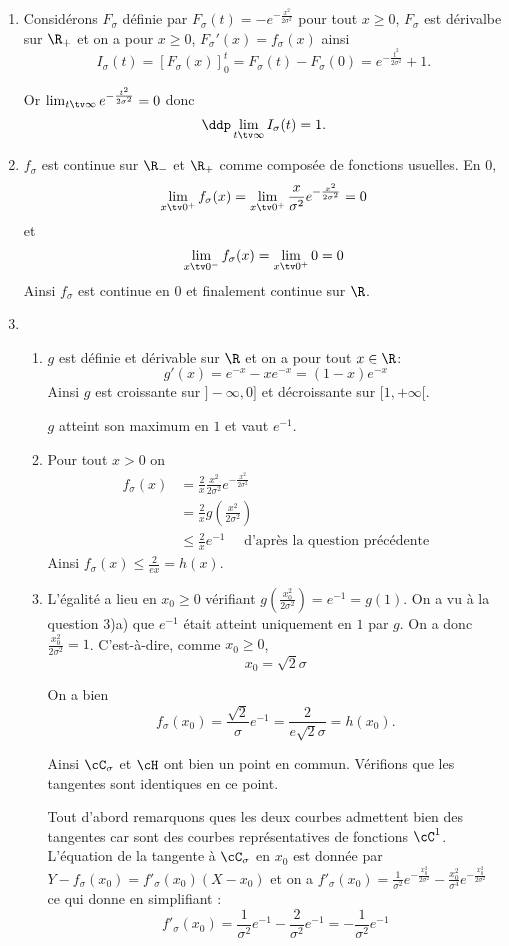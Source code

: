 \begin{correction}
\begin{enumerate}
\item Considérons $F_\sigma$ définie par $F_\sigma(t) =-e^{-\frac{x^2}{2\sigma^2}}$ pour tout $x\geq 0$, $F_\sigma$ est dérivalbe sur $\R_+$ et on a pour $x\geq 0$, $F_\sigma'(x) = f_\sigma(x)$ ainsi
$$I_\sigma( t) =\left[ F_\sigma(x) \right]_0^t = F_\sigma(t) -F_\sigma(0)= e^{-\frac{t^2}{2\sigma^2}}+1.$$

Or $\lim_{t\tv \infty} e^{-\frac{t^2}{2\sigma^2}}=0$ donc 
$$\ddp \lim_{t\tv \infty} I_\sigma(t) =1.$$
\item $f_\sigma $ est continue sur $\R_- $ et $\R_+$ comme composée de fonctions usuelles. En $0$, 
$$\lim_{x\tv 0^+} f_\sigma(x)  = \lim_{x\tv 0^+} \frac{x}{\sigma^2}e^{-\frac{x^2}{2\sigma^2}}  =0$$ 
et 
$$\lim_{x\tv 0^-} f_\sigma(x)  = \lim_{x\tv 0^+} 0 =0$$ 
Ainsi $f_\sigma $ est continue en $0$ et finalement continue sur $\R$. 
\item 
\begin{enumerate}
\item $g$ est définie et dérivable sur $\R$ et on a pour tout $x\in \R$: 
$$g'(x) = e^{-x} -xe^{-x} = (1-x) e^{-x}$$
Ainsi $g$ est croissante sur $]-\infty, 0] $ et décroissante sur $[1,+\infty[$. 

$g$ atteint son maximum en $1$ et vaut $e^{-1}$. 
\item Pour tout $x> 0$ on   
\begin{align*}
f_\sigma(x)& = \frac{2}{x}  \frac{x^2}{2\sigma^2}e^{-\frac{x^2}{2\sigma^2}} \\
				&= \frac{2}{x}   g(\frac{x^2}{2\sigma^2})\\
				&\leq \frac{2}{x}   e^{-1} \quad \text{ d'après la question précédente} 
\end{align*}
 Ainsi $f_\sigma(x) \leq \frac{2}{ex} =h(x)$.  
\item L'égalité a lieu en $x_0\geq 0$ vérifiant $g(\frac{x_0^2}{2\sigma^2})=e^{-1} =g(1)$. On a vu à la question 3)a) que $e^{-1}$ était atteint uniquement en $1$ par $g$. On a  donc $\frac{x_0^2}{2\sigma^2} =1$. 
C'est-à-dire, comme $x_0\geq 0$, $$x_0=\sqrt{2}\sigma$$

On a bien $$f_\sigma (x_0) = \frac{\sqrt{2}}{\sigma} e^{-1} = \frac{2}{e \sqrt{2} \sigma} = h(x_0).$$

Ainsi $\cC_\sigma $ et $\cH$ ont bien un point en commun. Vérifions que les tangentes sont identiques en ce point. 

Tout d'abord remarquons ques les deux courbes admettent bien  des tangentes car sont des courbes représentatives de fonctions $\cC^1$. L'équation de la tangente à $\cC_\sigma$ en $x_0$ est donnée par 
$Y - f_\sigma(x_0) = f'_\sigma(x_0) (X-x_0)$
et on a $f'_\sigma(x_0) = \frac{1}{\sigma^2} e^{-\frac{x_0^2}{2\sigma^2}}  - \frac{x_0^2}{\sigma^4}e^{-\frac{x_0^2}{2\sigma^2}} $ ce qui donne en  simplifiant :
$$f'_\sigma(x_0) =  \frac{1}{\sigma^2} e^{-1} - \frac{2}{\sigma^2}e^{-1}= - \frac{1}{\sigma^2}e^{-1} $$


\end{enumerate}
\end{enumerate}
\end{correction}

